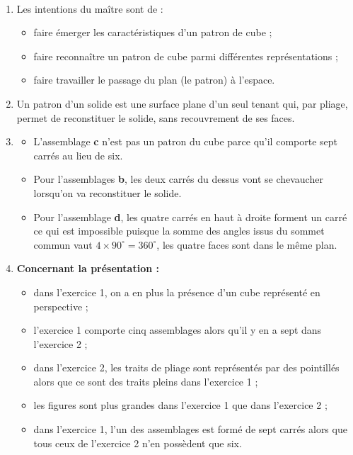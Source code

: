 \begin{corrige}
\ \\ [-5mm]
\begin{enumerate}
   \item Les intentions du maître sont de :
   \begin{itemize}
      \item faire émerger les caractéristiques d'un patron de cube ;
      \item faire reconnaître un patron de cube parmi différentes représentations ;
      \item faire travailler le passage du plan (le patron) à l'espace. 
   \end{itemize}
   \item Un \og patron \fg{} d'un solide est une surface plane d'un seul tenant qui, par pliage, permet de reconstituer le solide, sans recouvrement de ses faces. 
   \item
   \begin{itemize}
      \item L'assemblage {\bf c} n'est pas un patron du cube parce qu'il comporte sept carrés au lieu de six.
      \item Pour l'assemblages {\bf b}, les deux carrés \og du dessus \fg{} vont se chevaucher lorsqu'on va reconstituer le solide.
      \item Pour l'assemblage {\bf d}, les quatre carrés en haut à droite forment un carré ce qui est impossible puisque la somme des angles issus du sommet commun vaut $4\times90^\circ = 360^\circ$, les quatre faces sont dans le même plan.
   \end{itemize}   
   \item {\bf Concernant la présentation :} 
   \begin{itemize}
      \item dans l'exercice 1, on a en plus la présence d'un cube représenté en perspective ;
      \item l'exercice 1 comporte cinq assemblages alors qu'il y en a sept dans l'exercice 2 ;
      \item dans l'exercice 2, les \og traits de pliage \fg{} sont représentés par des pointillés alors que ce sont des traits pleins dans l'exercice 1 ;
      \item les figures sont plus grandes dans l'exercice 1 que dans l'exercice 2 ;
      \item dans l'exercice 1, l'un des assemblages est formé de sept carrés alors que tous ceux de l'exercice 2 n'en possèdent que six.
   \end{itemize}

\end{enumerate}
\end{corrige}
